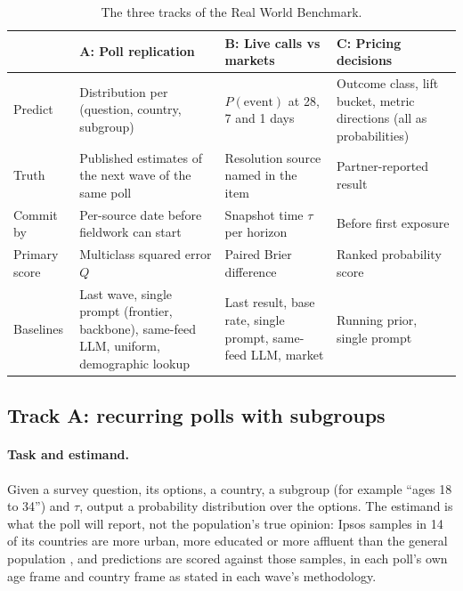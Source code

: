 \documentclass[11pt]{article}
\begin{document}
\begin{table}[t]
\centering
\small
\begin{tabular}{@{}L{2.1cm}L{4.1cm}L{4.1cm}L{4.1cm}@{}}
\toprule
 & \textbf{A: Poll replication} & \textbf{B: Live calls vs markets} & \textbf{C: Pricing decisions} \\
\midrule
Predict & Distribution per (question, country, subgroup) & $P(\text{event})$ at 28, 7 and 1 days & Outcome class, lift bucket, metric directions (all as probabilities) \\
Truth & Published estimates of the next wave of the same poll & Resolution source named in the item & Partner-reported result \\
Commit by & Per-source date before fieldwork can start & Snapshot time $\tau$ per horizon & Before first exposure \\
Primary score & Multiclass squared error $Q$ & Paired Brier difference & Ranked probability score \\
Baselines & Last wave, single prompt (frontier, backbone), same-feed LLM, uniform, demographic lookup & Last result, base rate, single prompt, same-feed LLM, market & Running prior, single prompt \\
\bottomrule
\end{tabular}
\caption{The three tracks of the Real World Benchmark.}
\label{tab:tracks}
\end{table}

\subsection{Track A: recurring polls with subgroups}
\label{sec:track-a}

\paragraph{Task and estimand.} Given a survey question, its options, a country, a subgroup (for example ``ages 18 to 34'') and $\tau$, output a probability distribution over the options. The estimand is what the poll will report, not the population's true opinion: Ipsos samples in 14 of its countries are more urban, more educated or more affluent than the general population \citep{ipsos2026may}, and predictions are scored against those samples, in each poll's own age frame and country frame as stated in each wave's methodology.
\end{document}
